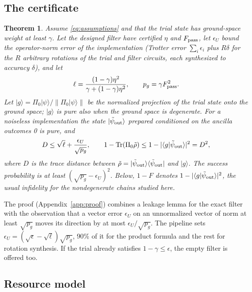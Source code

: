 \documentclass[aps,pra,twocolumn,superscriptaddress,nofootinbib]{revtex4-2}
\newtheorem{theorem}{Theorem}
\newcommand{\ket}[1]{|#1\rangle}
\newcommand{\bra}[1]{\langle#1|}
\newcommand{\norm}[1]{\lVert#1\rVert}
\begin{document}
\subsection{The certificate}

\begin{theorem}\label{thm:cert}
Assume \eqref{eq:assumptions} and that the trial state has ground-space weight at least $\gamma$. Let
the designed filter have certified $\eta$ and $F_{\rm pass}$, let $\epsilon_U$ bound the operator-norm
error of the implementation (Trotter error $\sum_i\epsilon_i$ plus $R\delta$ for the $R$ arbitrary
rotations of the trial and filter circuits, each synthesized to accuracy $\delta$), and let
\begin{equation}
\ell=\frac{(1-\gamma)\eta^2}{\gamma+(1-\gamma)\eta^2},\qquad p_g=\gamma F_{\rm pass}^2 .
\end{equation}
Let $\ket g=\Pi_0\ket\psi/\norm{\Pi_0\ket\psi}$ be the normalized projection of the trial state onto
the ground space; $\ket g$ is pure also when the ground space is degenerate. For a noiseless implementation the
state $\ket{\tilde\psi_{\rm out}}$ prepared conditioned on the ancilla outcomes 0 is pure, and
\begin{equation}
D\le\sqrt\ell+\frac{\epsilon_U}{\sqrt{p_g}},\qquad
1-\operatorname{Tr}(\Pi_0\tilde\rho)\le1-|\langle g|\tilde\psi_{\rm out}\rangle|^2=D^2,
\label{eq:cert}
\end{equation}
where $D$ is the trace distance between $\tilde\rho=\ket{\tilde\psi_{\rm out}}\bra{\tilde\psi_{\rm out}}$
and $\ket g$. The success probability is at least $(\sqrt{p_g}-\epsilon_U)^2$. Below, $1-F$ denotes
$1-|\langle g|\tilde\psi_{\rm out}\rangle|^2$, the usual infidelity for the nondegenerate chains studied here.
\end{theorem}

The proof (Appendix~\ref{app:proof}) combines a leakage lemma for the exact filter with the observation that a
vector error $\epsilon_U$ on an unnormalized vector of norm at least $\sqrt{p_g}$ moves its direction by at most
$\epsilon_U/\sqrt{p_g}$. The pipeline sets $\epsilon_U=(\sqrt\epsilon-\sqrt\ell)\sqrt{p_g}$, 90\% of it for the
product formula and the rest for rotation synthesis. If the trial already satisfies $1-\gamma\le\epsilon$, the
empty filter is offered too.

\subsection{Resource model}
\end{document}
